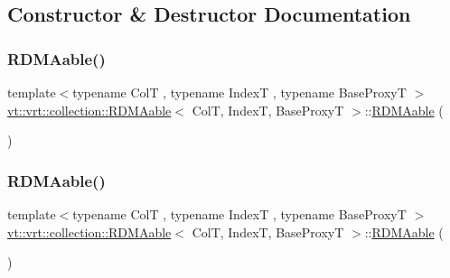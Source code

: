 \subsection{Constructor \& Destructor Documentation}
\mbox{\label{structvt_1_1vrt_1_1collection_1_1_r_d_m_aable_af26e9e951d466ed7ced91adaf495b6cd}} 
\subsubsection{\texorpdfstring{R\+D\+M\+Aable()}{RDMAable()}\hspace{0.1cm}{\footnotesize\ttfamily [1/4]}}
{\footnotesize\ttfamily template$<$typename ColT , typename IndexT , typename Base\+ProxyT $>$ \\
\hyperlink{structvt_1_1vrt_1_1collection_1_1_r_d_m_aable}{vt\+::vrt\+::collection\+::\+R\+D\+M\+Aable}$<$ ColT, IndexT, Base\+ProxyT $>$\+::\hyperlink{structvt_1_1vrt_1_1collection_1_1_r_d_m_aable}{R\+D\+M\+Aable} (\begin{DoxyParamCaption}{ }\end{DoxyParamCaption})\hspace{0.3cm}{\ttfamily [default]}}

\mbox{\label{structvt_1_1vrt_1_1collection_1_1_r_d_m_aable_a03d580ecebe0bffebe79272af156899c}} 
\subsubsection{\texorpdfstring{R\+D\+M\+Aable()}{RDMAable()}\hspace{0.1cm}{\footnotesize\ttfamily [2/4]}}
{\footnotesize\ttfamily template$<$typename ColT , typename IndexT , typename Base\+ProxyT $>$ \\
\hyperlink{structvt_1_1vrt_1_1collection_1_1_r_d_m_aable}{vt\+::vrt\+::collection\+::\+R\+D\+M\+Aable}$<$ ColT, IndexT, Base\+ProxyT $>$\+::\hyperlink{structvt_1_1vrt_1_1collection_1_1_r_d_m_aable}{R\+D\+M\+Aable} (\begin{DoxyParamCaption}\item[{\hyperlink{structvt_1_1vrt_1_1collection_1_1_r_d_m_aable}{R\+D\+M\+Aable}$<$ ColT, IndexT, Base\+ProxyT $>$ const \&}]{ }\end{DoxyParamCaption})\hspace{0.3cm}{\ttfamily [default]}}

